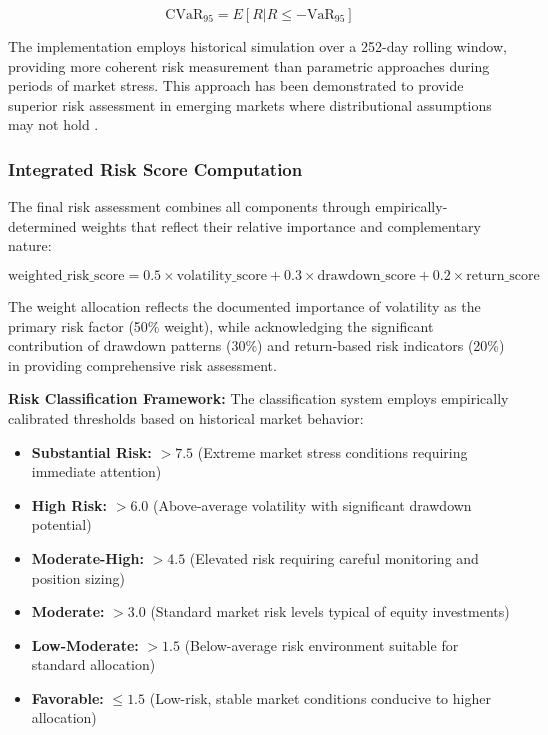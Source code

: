 \documentclass[3p,times,procedia]{elsarticle}
\begin{document}
\begin{equation}
\text{CVaR}_{95} = E[R | R \leq -\text{VaR}_{95}]
\end{equation}

The implementation employs historical simulation over a 252-day rolling window, providing more coherent risk measurement than parametric approaches during periods of market stress. This approach has been demonstrated to provide superior risk assessment in emerging markets where distributional assumptions may not hold \cite{Jorion2001}.

\subsubsection{{Integrated Risk Score Computation}}

The final risk assessment combines all components through empirically-determined weights that reflect their relative importance and complementary nature:

\begin{equation}
\text{weighted\_risk\_score} = 0.5 \times \text{volatility\_score} + 0.3 \times \text{drawdown\_score} + 0.2 \times \text{return\_score}
\end{equation}

The weight allocation reflects the documented importance of volatility as the primary risk factor (50\% weight), while acknowledging the significant contribution of drawdown patterns (30\%) and return-based risk indicators (20\%) in providing comprehensive risk assessment.

\textbf{Risk Classification Framework:}
The classification system employs empirically calibrated thresholds based on historical market behavior:
\begin{itemize}
    \vspace{0.5cm}
    \item \textbf{Substantial Risk:} $> 7.5$ (Extreme market stress conditions requiring immediate attention)
    \item \textbf{High Risk:} $> 6.0$ (Above-average volatility with significant drawdown potential)
    \item \textbf{Moderate-High:} $> 4.5$ (Elevated risk requiring careful monitoring and position sizing)
    \item \textbf{Moderate:} $> 3.0$ (Standard market risk levels typical of equity investments)
    \item \textbf{Low-Moderate:} $> 1.5$ (Below-average risk environment suitable for standard allocation)
    \item \textbf{Favorable:} $\leq 1.5$ (Low-risk, stable market conditions conducive to higher allocation)
\end{itemize} 
\end{document}
